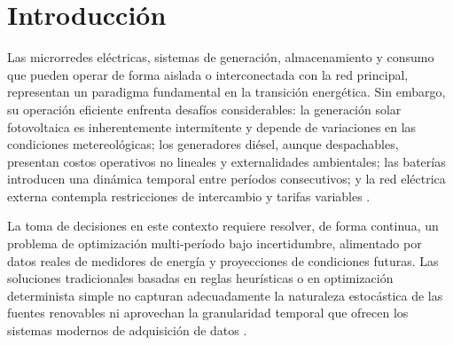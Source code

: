 \documentclass[journal,article,submit,pdftex,moreauthors]{Definitions/mdpi}
\begin{document}
\section{Introducci\'on}

Las microrredes el\'ectricas, sistemas de generaci\'on, almacenamiento y consumo que pueden operar de forma aislada o interconectada con la red principal, representan un paradigma fundamental en la transici\'on energ\'etica. Sin embargo, su operaci\'on eficiente enfrenta desaf\'ios considerables: la generaci\'on solar fotovoltaica es inherentemente intermitente y depende de variaciones en las condiciones metereológicas; los generadores di\'esel, aunque despachables, presentan costos operativos no lineales y externalidades ambientales; las bater\'ias introducen una dinámica temporal entre per\'iodos consecutivos; y la red el\'ectrica externa contempla restricciones de intercambio y tarifas variables \cite{ref-alternar}.

La toma de decisiones en este contexto requiere resolver, de forma continua, un problema de optimizaci\'on multi-per\'iodo bajo incertidumbre, alimentado por datos reales de medidores de energía y proyecciones de condiciones futuras. Las soluciones tradicionales basadas en reglas heur\'isticas o en optimizaci\'on determinista simple no capturan adecuadamente la naturaleza estoc\'astica de las fuentes renovables ni aprovechan la granularidad temporal que ofrecen los sistemas modernos de adquisici\'on de datos \cite{ref-carrasco} .
\end{document}
